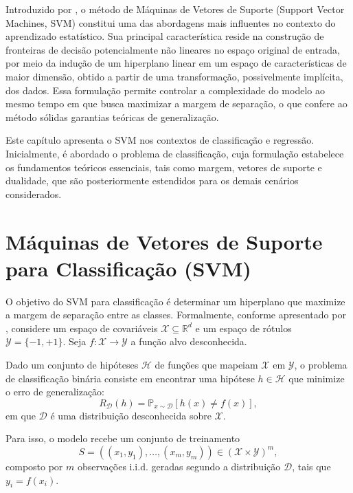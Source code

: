 
\noindent Introduzido por \cite{vapnik1997support}, o método de Máquinas de Vetores de
Suporte (Support Vector Machines, SVM) constitui uma das abordagens mais influentes no
contexto do aprendizado estatístico. Sua principal característica reside na construção
de fronteiras de decisão potencialmente não lineares no espaço original de entrada, por
meio da indução de um hiperplano linear em um espaço de características de maior dimensão,
obtido a partir de uma transformação, possivelmente implícita, dos dados. Essa formulação
permite controlar a complexidade do modelo ao mesmo tempo em que busca maximizar a margem
de separação, o que confere ao método sólidas garantias teóricas de generalização.

Este capítulo apresenta o SVM nos contextos de classificação e regressão. Inicialmente,
é abordado o problema de classificação, cuja formulação estabelece os fundamentos teóricos
essenciais, tais como margem, vetores de suporte e dualidade, que são posteriormente
estendidos para os demais cenários considerados.

\section{Máquinas de Vetores de Suporte para Classificação (SVM)}

O objetivo do SVM para classificação é determinar um hiperplano que maximize a margem de
separação entre as classes. Formalmente, conforme apresentado por
, considere um espaço de covariáveis
$\mathcal{X} \subseteq \mathbb{R}^d$ e um espaço de rótulos $\mathcal{Y} = \{-1, +1\}$.
Seja $\mathit{f} : \mathcal{X} \rightarrow \mathcal{Y}$ a função alvo desconhecida.

Dado um conjunto de hipóteses $\mathcal{H}$ de funções que mapeiam $\mathcal{X}$ em
$\mathcal{Y}$, o problema de classificação binária consiste em encontrar uma hipótese
$\mathit{h} \in \mathcal{H}$ que minimize o erro de generalização:
\[
\mathit{R}_{\mathcal{D}}(\mathit{h}) = \mathbb{P}_{\mathit{x} \sim \mathcal{D}} \left[\mathit{h}(\mathit{x}) \neq \mathit{f}(\mathit{x})\right],
\]
em que $\mathcal{D}$ é uma distribuição desconhecida sobre $\mathcal{X}$.

Para isso, o modelo recebe um conjunto de treinamento
\[
\mathit{S} = \left((\mathit{x}_1, \mathit{y}_1), \ldots, (\mathit{x}_m, \mathit{y}_m)\right) \in (\mathcal{X} \times \mathcal{Y})^m,
\]
composto por $\mathit{m}$ observações i.i.d. geradas segundo a distribuição $\mathcal{D}$,
tais que $\mathit{y}_i = \mathit{f}(\mathit{x}_i)$.

